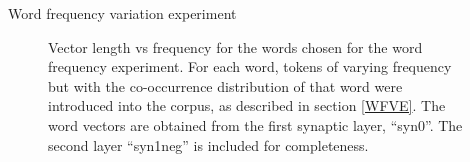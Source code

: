 \documentclass{article} %
\begin{document}
\begin{section}{Word frequency variation experiment}
\begin{figure}
	\caption{
	Vector length vs frequency for the words chosen for the word frequency
	experiment.  For each word, tokens of varying frequency but with the
	co-occurrence distribution of that word were introduced into the
	corpus, as described in section \ref{WFVE}.
	The word vectors are obtained from the first synaptic layer, ``syn0''.
	The second layer ``syn1neg'' is included for completeness.
	}
	\label{fig:word-frequency-experiment-graph}
\end{figure}

\end{section}
\end{document}
